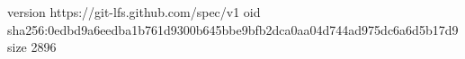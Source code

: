 version https://git-lfs.github.com/spec/v1
oid sha256:0edbd9a6eedba1b761d9300b645bbe9bfb2dca0aa04d744ad975dc6a6d5b17d9
size 2896
